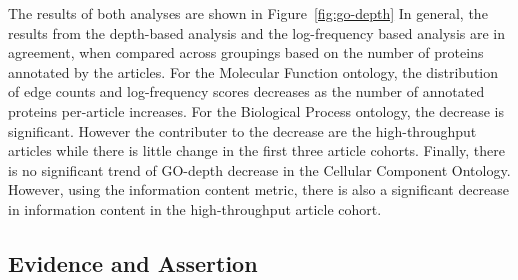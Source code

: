 \documentclass[12pt]{article}
\begin{document}
The results of both analyses are shown in Figure~\ref{fig:go-depth} %
In general, the results from the depth-based analysis and the
log-frequency based analysis are in agreement, when compared across groupings based on the
number of proteins annotated by the articles. For the Molecular Function ontology, the
distribution of edge counts and log-frequency scores decreases as the number of annotated
proteins per-article increases.  For the Biological Process ontology, the decrease is
significant. However the contributer to the decrease are the high-throughput articles
while there is little change in the first three article cohorts.
Finally, there is no significant trend of GO-depth decrease in the Cellular Component
Ontology. However, using the information content metric, there is also a significant decrease
in information content in the high-throughput article cohort.


\subsection*{Evidence and Assertion}
\end{document}

